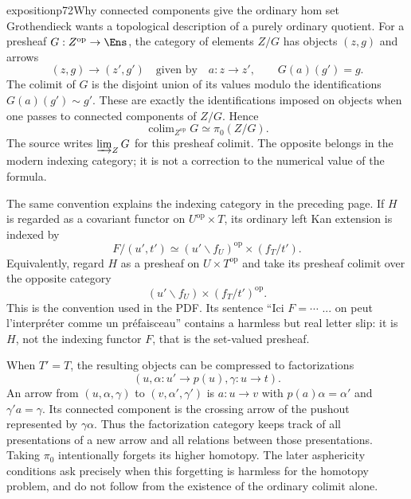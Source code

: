 \begin{dcomment}{exposition}{p72}{Why connected components give the ordinary hom set}
Grothendieck wants a topological description of a purely ordinary quotient. For a presheaf $G:Z^{\mathrm{op}}\to\Ens$, the category of elements $Z/G$ has objects $(z,g)$ and arrows
\[
 (z,g)\longrightarrow(z',g')\quad\text{given by}\quad
 a:z\longrightarrow z',\qquad G(a)(g')=g.
\]
The colimit of $G$ is the disjoint union of its values modulo the identifications $G(a)(g')\sim g'$. These are exactly the identifications imposed on objects when one passes to connected components of $Z/G$. Hence
\[
 \mathop{\mathrm{colim}}_{Z^{\mathrm{op}}}G\simeq\pi_0(Z/G).
\]
The source writes $\varinjlim_Z G$ for this presheaf colimit. The opposite belongs in the modern indexing category; it is not a correction to the numerical value of the formula.

The same convention explains the indexing category in the preceding page. If $H$ is regarded as a covariant functor on $U^{\mathrm{op}}\times T$, its ordinary left Kan extension is indexed by
\[
 F/(u',t')\simeq (u'\backslash f_U)^{\mathrm{op}}\times(f_T/t').
\]
Equivalently, regard $H$ as a presheaf on $U\times T^{\mathrm{op}}$ and take its presheaf colimit over the opposite category
\[
 (u'\backslash f_U)\times(f_T/t')^{\mathrm{op}}.
\]
This is the convention used in the PDF. Its sentence ``Ici $F=\cdots$ ... on peut l'interpr\'eter comme un pr\'efaisceau'' contains a harmless but real letter slip: it is $H$, not the indexing functor $F$, that is the set-valued presheaf.

When $T'=T$, the resulting objects can be compressed to factorizations
\[
 (u,\alpha:u'\to p(u),\gamma:u\to t).
\]
An arrow from $(u,\alpha,\gamma)$ to $(v,\alpha',\gamma')$ is $a:u\to v$ with $p(a)\alpha=\alpha'$ and $\gamma'a=\gamma$. Its connected component is the crossing arrow of the pushout represented by $\gamma\alpha$. Thus the factorization category keeps track of all presentations of a new arrow and all relations between those presentations. Taking $\pi_0$ intentionally forgets its higher homotopy. The later asphericity conditions ask precisely when this forgetting is harmless for the homotopy problem, and do not follow from the existence of the ordinary colimit alone.
\end{dcomment}

